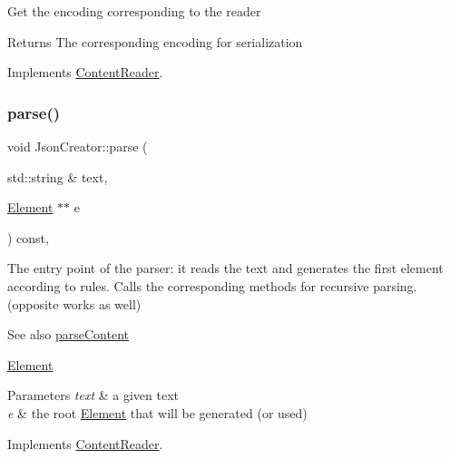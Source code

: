 Get the encoding corresponding to the reader

\begin{DoxyReturn}{Returns}
The corresponding encoding for serialization 
\end{DoxyReturn}


Implements \mbox{\hyperlink{classContentReader_a1495a4402c4fac02d8cd2542b61c6eed}{Content\+Reader}}.

\mbox{\label{classJsonCreator_a505ff309c6b144d29478804b0e187c6f}} 
\subsubsection{\texorpdfstring{parse()}{parse()}}
{\footnotesize\ttfamily void Json\+Creator\+::parse (\begin{DoxyParamCaption}\item[{std\+::string \&}]{text,  }\item[{\mbox{\hyperlink{classElement}{Element}} $\ast$$\ast$}]{e }\end{DoxyParamCaption}) const\hspace{0.3cm}{\ttfamily [override]}, {\ttfamily [virtual]}}

The entry point of the parser\+: it reads the text and generates the first element according to rules. Calls the corresponding methods for recursive parsing. (opposite works as well) \begin{DoxySeeAlso}{See also}
\mbox{\hyperlink{classJsonCreator_a0fe34794ee3563c3e0bc35006129fcdc}{parse\+Content}} 

\mbox{\hyperlink{classElement}{Element}}
\end{DoxySeeAlso}

\begin{DoxyParams}{Parameters}
{\em text} & a given text \\
\hline
{\em e} & the root \mbox{\hyperlink{classElement}{Element}} that will be generated (or used) \\
\hline
\end{DoxyParams}


Implements \mbox{\hyperlink{classContentReader_a7fff2e63a2e8fa216665604f69974e1d}{Content\+Reader}}.

\mbox{\label{classJsonCreator_a0fe34794ee3563c3e0bc35006129fcdc}} 
